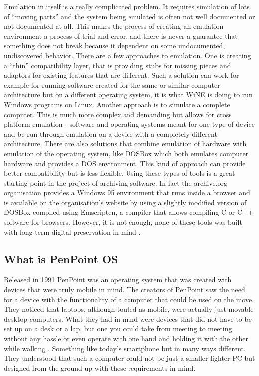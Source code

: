 Emulation in itself is a really complicated problem. It requires simulation of
lots of ``moving parts'' and the system being emulated is often not well
documented or not documented at all. This makes the process of creating an
emulation environment a process of trial and error, and there is never
a guarantee that something does not break because it dependent on some
undocumented, undiscovered behavior. There are a few approaches to emulation.
One is creating a ``thin'' compatibility layer, that is providing stubs for
missing pieces and adaptors for existing features that are different. Such
a solution can work for example for running software created for the same or
similar computer architecture but on a different operating system, it is what
WiNE is doing to run Windows programs on Linux. Another approach is to simulate
a complete computer. This is much more complex and demanding but allows for
cross platform emulation - software and operating systems meant for one type of
device and be run through emulation on a device with a completely different
architecture. There are also solutions that combine emulation of hardware with
emulation of the operating system, like DOSBox which both emulates computer
hardware and provides a DOS environment. This kind of approach can provide
better compatibility but is less flexible. Using these types of tools is
a great starting point in the project of archiving software. In fact the
archive.org organisation provides a Windows 95 environment that runs inside
a browser and is available on the organisation's website \cite{win95web} by
using a slightly modified version of DOSBox compiled using Emscripten,
a compiler that allows compiling C or C++ software for browsers. However, it is
not enough, none of these tools was built with long term digital preservation
in mind \cite{hoeven2007}.

\subsection{What is PenPoint OS}

Released in 1991 PenPoint was an operating system that was created with devices
that were truly mobile in mind. The creators of PenPoint saw the need for
a device with the functionality of a computer that could be used on the move.
They noticed that laptops, although touted as mobile, were actually just
movable desktop computers. What they had in mind were devices that did not have
to be set up on a desk or a lap, but one you could take from meeting to meeting
\cite{startupadv} without any hassle or even operate with one hand and holding
it with the other while walking \cite{carr1991}. Something like today's
smartphone but in many ways different. They understood that such a computer
could not be just a smaller lighter PC but designed from the ground up with
these requirements in mind.

